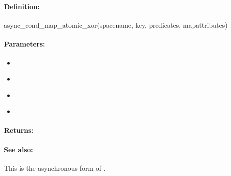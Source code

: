 \pagebreak
\subsubsection{}
\label{api:ruby:async_cond_map_atomic_xor}


\paragraph{Definition:}
\begin{rubycode}
async_cond_map_atomic_xor(spacename, key, predicates, mapattributes)
\end{rubycode}

\paragraph{Parameters:}
\begin{itemize}[noitemsep]
\item {}\\

\item {}\\

\item {}\\

\item {}\\

\end{itemize}

\paragraph{Returns:}


\paragraph{See also:}  This is the asynchronous form of .

\pagebreak
\subsubsection{}
\label{api:ruby:group_map_atomic_xor}


